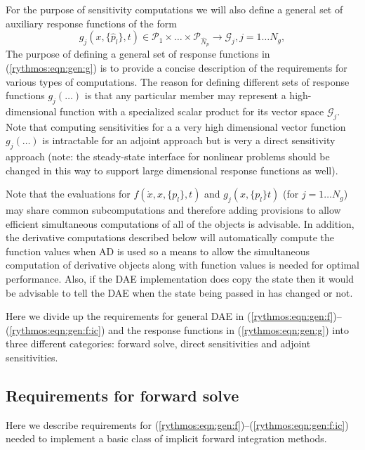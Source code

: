 \documentclass[pdf,ps2pdf,11pt]{SANDreport}
\begin{document}
For the purpose of sensitivity computations we will also define a general
set of auxiliary response functions of the form
%
\begin{equation}
g_j(x,\{\hat{p}_l\},t) \in \mathcal{P}_1 \times \ldots \times \mathcal{P}_{\hat{N}_p} \rightarrow \mathcal{G}_j, j=1 \ldots N_g, 
\label{rythmos:eqn:gen:g}
\end{equation}
%
The purpose of defining a general set of response functions in
(\ref{rythmos:eqn:gen:g}) is to provide a concise description of the
requirements for various types of computations.  The reason for defining
different sets of response functions $g_j(\ldots)$ is that any particular
member may represent a high-dimensional function with a specialized scalar
product for its vector space $\mathcal{G}_j$.  Note that computing
sensitivities for a a very high dimensional vector function $g_j(\ldots)$ is
intractable for an adjoint approach but is very a direct sensitivity approach
(note: the steady-state interface for nonlinear problems should be changed in
this way to support large dimensional response functions as well).

Note that the evaluations for $f(\dot{x},x,\{p_l\},t)$ and $g_j(x,\{p_l\}t)$
(for $j = 1 {}\ldots N_g$) may share common subcomputations and therefore
adding provisions to allow efficient simultaneous computations of all of the
objects is advisable.  In addition, the derivative computations described
below will automatically compute the function values when AD is used so a
means to allow the simultaneous computation of derivative objects along with
function values is needed for optimal performance.  Also, if the DAE
implementation does copy the state then it would be advisable to tell the DAE
when the state being passed in has changed or not.

Here we divide up the requirements for general DAE in
(\ref{rythmos:eqn:gen:f})--(\ref{rythmos:eqn:gen:f:ic}) and the response
functions in (\ref{rythmos:eqn:gen:g}) into three different categories:
forward solve, direct sensitivities and adjoint sensitivities.

\subsection{Requirements for forward solve}

Here we describe requirements for
(\ref{rythmos:eqn:gen:f})--(\ref{rythmos:eqn:gen:f:ic}) needed to
implement a basic class of implicit forward integration methods.
\end{document}
